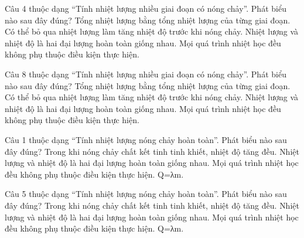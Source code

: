 \begin{ex}
Câu 4 thuộc dạng “Tính nhiệt lượng nhiều giai đoạn có nóng chảy”. Phát biểu nào sau đây đúng?
\choice
{\True Tổng nhiệt lượng bằng tổng nhiệt lượng của từng giai đoạn.}
{Có thể bỏ qua nhiệt lượng làm tăng nhiệt độ trước khi nóng chảy.}
{Nhiệt lượng và nhiệt độ là hai đại lượng hoàn toàn giống nhau.}
{Mọi quá trình nhiệt học đều không phụ thuộc điều kiện thực hiện.}
\end{ex}

\begin{ex}
Câu 8 thuộc dạng “Tính nhiệt lượng nhiều giai đoạn có nóng chảy”. Phát biểu nào sau đây đúng?
\choice
{\True Tổng nhiệt lượng bằng tổng nhiệt lượng của từng giai đoạn.}
{Có thể bỏ qua nhiệt lượng làm tăng nhiệt độ trước khi nóng chảy.}
{Nhiệt lượng và nhiệt độ là hai đại lượng hoàn toàn giống nhau.}
{Mọi quá trình nhiệt học đều không phụ thuộc điều kiện thực hiện.}
\end{ex}

\begin{ex}
Câu 1 thuộc dạng “Tính nhiệt lượng nóng chảy hoàn toàn”. Phát biểu nào sau đây đúng?
\choice
{Trong khi nóng chảy chất kết tinh tinh khiết, nhiệt độ tăng đều.}
{Nhiệt lượng và nhiệt độ là hai đại lượng hoàn toàn giống nhau.}
{Mọi quá trình nhiệt học đều không phụ thuộc điều kiện thực hiện.}
{\True Q=λm.}
\end{ex}

\begin{ex}
Câu 5 thuộc dạng “Tính nhiệt lượng nóng chảy hoàn toàn”. Phát biểu nào sau đây đúng?
\choice
{Trong khi nóng chảy chất kết tinh tinh khiết, nhiệt độ tăng đều.}
{Nhiệt lượng và nhiệt độ là hai đại lượng hoàn toàn giống nhau.}
{Mọi quá trình nhiệt học đều không phụ thuộc điều kiện thực hiện.}
{\True Q=λm.}
\end{ex}

